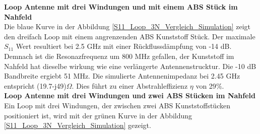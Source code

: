 \textbf{Loop Antenne mit drei Windungen und mit einem ABS Stück im Nahfeld}\\
Die blaue Kurve in der Abbildung \ref{S11_Loop_3N_Vergleich_Simulation} zeigt den dreifach Loop mit einem angrenzenden ABS Kunststoff Stück. Der maximale $S_{11}$ Wert resultiert bei 2.5 GHz mit einer Rückflussdämpfung von -14 dB. Demnach ist die Resonazfrequenz um 800 MHz gefallen, der Kunststoff im Nahfeld hat dieselbe wirkung wie eine verlängerte Antennenstrucktur. Die -10 dB Bandbreite ergiebt 51 MHz. Die simulierte Antennenimpedanz bei 2.45 GHz entspricht (19.7-j49)$\Omega$. Dies führt zu einer Abstrahleffizienz $\eta$ von 29$\%$.\\

\textbf{Loop Antenne mit drei Windungen und zwei ABS Stücken im Nahfeld}\\
Ein Loop mit drei Windungen, der zwischen zwei ABS Kunststoffstücken positioniert ist, wird mit der grünen Kurve in der Abbildung \ref{S11_Loop_3N_Vergleich_Simulation} gezeigt.\\

